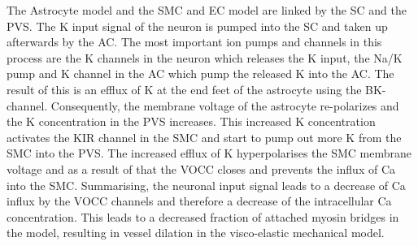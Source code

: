The Astrocyte model and the \gls{SMC} and \gls{EC} model are linked by the SC and the \gls{PVS}. The \gls{K} input signal of the neuron is pumped into the \gls{SC} and taken up afterwards by the AC. The most important ion pumps and channels in this process are the \gls{K} channels in the neuron which releases the \gls{K} input,  the \gls{Na}/\gls{K} pump and \gls{K} channel in the \gls{AC} which pump the released \gls{K} into the AC.
The result of this is an efflux of \gls{K} at the end feet of the astrocyte using the BK-channel. Consequently, the membrane voltage of the astrocyte re-polarizes and the \gls{K} concentration in the PVS increases. This increased \gls{K} concentration activates the KIR channel in the \gls{SMC} and start to pump out more \gls{K} from the \gls{SMC} into the \gls{PVS}. The increased efflux of \gls{K} hyperpolarises the \gls{SMC} membrane voltage and as a result of that the VOCC closes and prevents the influx of \gls{Ca} into the \gls{SMC}.
Summarising, the neuronal input signal leads to a decrease of \gls{Ca} influx by the VOCC channels and therefore a decrease of the intracellular \gls{Ca} concentration. This leads to a decreased fraction of attached myosin bridges in the \citet{Hai1989} model, resulting in vessel dilation in the visco-elastic mechanical model.







